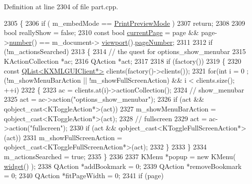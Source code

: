 Definition at line 2304 of file part.\+cpp.


\begin{DoxyCode}
2305 \{
2306     \textcolor{keywordflow}{if} ( m\_embedMode == \hyperlink{namespaceOkular_adbe21e337d65d3f5f07a441180428ba8a3c886e44dadfdb624559818a85d90b94}{PrintPreviewMode} )
2307        \textcolor{keywordflow}{return};
2308 
2309     \textcolor{keywordtype}{bool} reallyShow = \textcolor{keyword}{false};
2310     \textcolor{keyword}{const} \textcolor{keywordtype}{bool} \hyperlink{classOkular_1_1Part_ac8275b0585ad5cec819ca54ef1f29811}{currentPage} = page && page->\hyperlink{classOkular_1_1Page_a6eee5f157a130b47d81ddd63e501664b}{number}() == m\_document->
      \hyperlink{classOkular_1_1Document_abb8738de0a53aa4a9f552de0e1e749f8}{viewport}().\hyperlink{classOkular_1_1DocumentViewport_a122674d4a493e79b1aa5fd5c00e81c93}{pageNumber};
2311 
2312     \textcolor{keywordflow}{if} (!m\_actionsSearched)
2313     \{
2314         \textcolor{comment}{// the quest for options\_show\_menubar}
2315         KActionCollection *ac;
2316         QAction *act;
2317 
2318         \textcolor{keywordflow}{if} (factory())
2319         \{
2320             \textcolor{keyword}{const} \hyperlink{classQList}{QList<KXMLGUIClient*>} clients(factory()->clients());
2321             \textcolor{keywordflow}{for}(\textcolor{keywordtype}{int} i = 0 ; (!m\_showMenuBarAction || !m\_showFullScreenAction) && i < clients.size(); ++i)
2322             \{
2323                 ac = clients.at(i)->actionCollection();
2324                 \textcolor{comment}{// show\_menubar}
2325                 act = ac->action(\textcolor{stringliteral}{"options\_show\_menubar"});
2326                 \textcolor{keywordflow}{if} (act && qobject\_cast<KToggleAction*>(act))
2327                     m\_showMenuBarAction = qobject\_cast<KToggleAction*>(act);
2328                 \textcolor{comment}{// fullscreen}
2329                 act = ac->action(\textcolor{stringliteral}{"fullscreen"});
2330                 \textcolor{keywordflow}{if} (act && qobject\_cast<KToggleFullScreenAction*>(act))
2331                     m\_showFullScreenAction = qobject\_cast<KToggleFullScreenAction*>(act);
2332             \}
2333         \}
2334         m\_actionsSearched = \textcolor{keyword}{true};
2335     \}
2336 
2337     KMenu *popup = \textcolor{keyword}{new} KMenu( \hyperlink{classKParts_1_1Part_a134900cb0605a1cd5113d90954a01fdf}{widget}() );
2338     QAction *addBookmark = 0;
2339     QAction *removeBookmark = 0;
2340     QAction *fitPageWidth = 0;
2341     \textcolor{keywordflow}{if} (page)

\end{DoxyCode}

